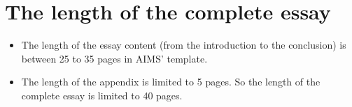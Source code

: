 \section{The length of the complete essay}

\begin{itemize}	
	\item The length of the essay content (from the introduction to the conclusion) is between 25 to 35 pages in AIMS' template.
	\item The length of the appendix is limited to 5 pages. So the length of the complete essay is limited to 40 pages.
\end{itemize}


